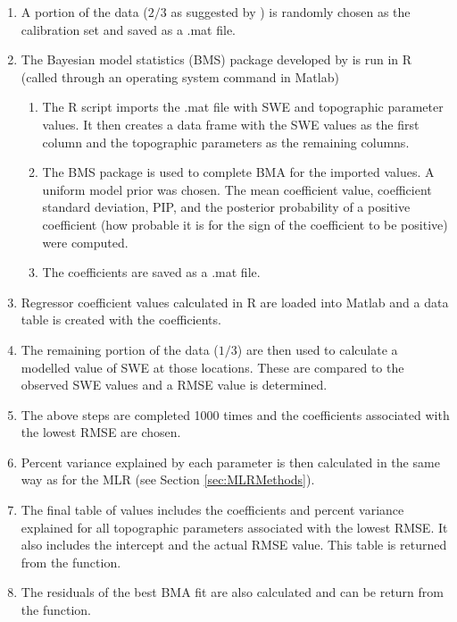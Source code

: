 \documentclass[12pt]{article}
\begin{document}
\begin{enumerate}
\item A portion of the data ($2/3$ as suggested by \cite{Kohavi1995}) is randomly chosen as the calibration set and saved as a .mat file. 
\item The Bayesian model statistics (BMS) package developed by \cite{Zeugner2015} is run in R (called through an operating system command in Matlab)
	\begin{enumerate}
		\item The R script imports the .mat file with SWE and topographic parameter values. It then creates a data frame with the SWE values as the first column and the topographic parameters as the remaining 	columns. 
		\item The BMS package is used to complete BMA for the imported values. A uniform model prior was chosen. The mean coefficient value, coefficient standard deviation, PIP, and the posterior probability of a positive coefficient (how probable it is for the sign of the coefficient to be positive) were computed.
		\item The coefficients are saved as a .mat file.
	\end{enumerate}
\item Regressor coefficient values calculated in R are loaded into Matlab and a data table is created with the coefficients.
\item The remaining portion of the data ($1/3$) are then used to calculate a modelled value of SWE at those locations. These are compared to the observed SWE values and a RMSE value is determined.
\item The above steps are completed 1000 times and the coefficients associated with the lowest RMSE are chosen.
\item Percent variance explained by each parameter is then calculated in the same way as for the MLR (see Section \ref{sec:MLRMethods}). 
\item The final table of values includes the coefficients and percent variance explained for all topographic parameters associated with the lowest RMSE. It also includes the intercept and the actual RMSE value. This table is returned from the function.
\item The residuals of the best BMA fit are also calculated and can be return from the function.  
\end{enumerate}
	
\pagebreak


\end{document}
